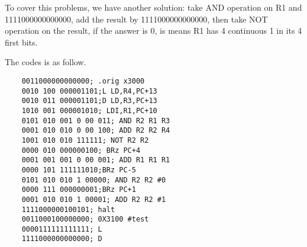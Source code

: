 \documentclass[20pt]{ctexart}
\begin{document}
To cover this problems, we have another solution: take AND operation on R1 and 1111000000000000, add the result by 1111000000000000, then take NOT operation on the result, if the answer is 0, is means R1 has 4 continuous 1 in its 4 first bits.

The codes is as follow.

\begin{verbatim}
    0011000000000000; .orig x3000
    0010 100 000001101;L LD,R4,PC+13
    0010 011 000001101;D LD,R3,PC+13
    1010 001 000001010; LDI,R1,PC+10
    0101 010 001 0 00 011; AND R2 R1 R3
    0001 010 010 0 00 100; ADD R2 R2 R4
    1001 010 010 111111; NOT R2 R2
    0000 010 000000100; BRz PC+4
    0001 001 001 0 00 001; ADD R1 R1 R1
    0000 101 111111010;BRz PC-5
    0101 010 010 1 00000; AND R2 R2 #0
    0000 111 000000001;BRz PC+1
    0001 010 010 1 00001; ADD R2 R2 #1
    1111000000100101; halt
    0011000100000000; 0X3100 #test
    0000111111111111; L
    1111000000000000; D
    \end{verbatim}

 
\end{document}
